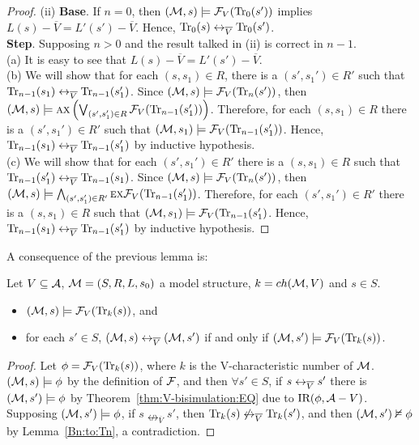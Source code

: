 \documentclass{article}
\begin{document}
\begin{proof}
(ii)  \textbf{Base}. If $n=0$, then $({\cal M}, s)  \models {\cal F}_V(\textrm{Tr}_0(s'))$ implies $L(s) - \overline V = L'(s') - \overline V$. Hence, $\textrm{Tr}_0(s) \leftrightarrow_{\overline V} \textrm{Tr}_0(s')$.\\
    \textbf{Step}. Supposing $n>0$ and the result talked in (ii) is correct in $n-1$.\\
   (a) It is easy to see that $L(s) - \overline V = L'(s') - \overline V$.\\
   (b) We will show that for each $(s, s_1) \in R$, there is a $(s', s_1') \in R'$ such that $\textrm{Tr}_{n-1}(s_1) \leftrightarrow_{\overline V} \textrm{Tr}_{n-1}(s_1')$.
      Since $({\cal M}, s) \models {\cal F}_V(\textrm{Tr}_n(s'))$, then $({\cal M}, s) \models \textsc{a} \textsc{x}\left(\bigvee_{(s',s_1')\in R}{\cal F}_V(\textrm{Tr}_{n-1}(s_1') )\right)$.
      Therefore, for each $(s, s_1) \in R$ there is a $(s', s_1') \in R'$ such that $({\cal M}, s_1) \models {\cal F}_V(\textrm{Tr}_{n-1}(s_1') )$. Hence, $\textrm{Tr}_{n-1}(s_1) \leftrightarrow_{\overline V} \textrm{Tr}_{n-1}(s_1')$ by inductive hypothesis.\\
   (c) We will show that for each $(s',s_1')\in R'$ there is a $(s,s_1)\in R$ such that $\textrm{Tr}_{n-1}(s_1') \leftrightarrow_{\overline V} \textrm{Tr}_{n-1}(s_1)$.
      Since $({\cal M}, s) \models {\cal F}_V(\textrm{Tr}_n(s'))$, then $({\cal M}, s) \models  \bigwedge_{(s',s_1')\in R'} \textsc{e} \textsc{x} {\cal F}_V(\textrm{Tr}_{n-1}(s_1'))$.
      Therefore, for each $(s',s_1')\in R'$ there is a $(s,s_1)\in R$ such that $({\cal M}, s_1) \models {\cal F}_V(\textrm{Tr}_{n-1}(s_1')$.
      Hence, $\textrm{Tr}_{n-1}(s_1) \leftrightarrow_{\overline V} \textrm{Tr}_{n-1}(s_1')$ by inductive hypothesis.
\end{proof}


A consequence of the previous lemma is:

\begin{lemma}\label{div_s}
Let $V\subseteq {\cal A}$, ${\cal M}=(S,R,L,s_0)$ a model structure, $k={ch({\cal M},V)}$ and $s\in S$.
\begin{itemize}
  \item $({\cal M}, s)\models {\cal F}_V(\textrm{Tr}_k(s))$, and
  \item for each $s'\in S$, $({\cal M},s) \leftrightarrow_{\overline V} ({\cal M},s')$
  if and only if $({\cal M},s')\models{\cal F}_V(\textrm{Tr}_k(s))$.
\end{itemize}
\end{lemma}
\begin{proof}
Let $\phi = {\cal F}_V(\textrm{Tr}_k(s))$, where $k$ is the V-characteristic number of ${\cal M}$. $({\cal M}, s) \models \phi$ by the definition of ${\cal F}$, and then $\forall s' \in S$, if $s \leftrightarrow_{\overline V} s'$ there is $({\cal M}, s') \models \phi$ by Theorem~\ref{thm:V-bisimulation:EQ} due to $\textrm{IR}(\phi, {\cal A} - V)$. Supposing $({\cal M}, s')\models \phi$, if $s \nleftrightarrow_{\overline V} s'$, then $\textrm{Tr}_k(s) \not \leftrightarrow_{\overline V} \textrm{Tr}_k(s')$, and then $({\cal M}, s')\nvDash \phi$ by Lemma~\ref{Bn:to:Tn}, a contradiction.
\end{proof}
\end{document}

